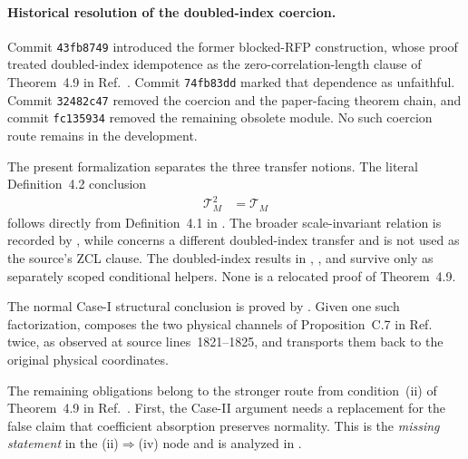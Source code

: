 \documentclass{article}
\begin{document}
\paragraph{Historical resolution of the doubled-index coercion.}
Commit \texttt{43fb8749} introduced the former blocked-RFP construction, whose
proof treated doubled-index idempotence as the zero-correlation-length clause
of Theorem~4.9 in Ref.~\cite{Cirac2016MPDO_arXiv}. Commit
\texttt{74fb83dd} marked that dependence as unfaithful. Commit
\texttt{32482c47} removed the coercion and the paper-facing theorem chain, and
commit \texttt{fc135934} removed the remaining obsolete module. No such
coercion route remains in the development.

The present formalization separates the three transfer notions. The literal
Definition~4.2 conclusion
\begin{align}
    \mathcal T_M^2
    &=\mathcal T_M
    \label{eq:zcl_definition42_literal_conclusion}
\end{align}
follows directly from Definition~4.1 in
. The broader
scale-invariant relation is recorded by , while
 concerns a different doubled-index transfer and is
not used as the source's ZCL clause. The doubled-index results in
, , and
 survive only as separately scoped conditional
helpers. None is a relocated proof of Theorem~4.9.

The normal Case-I structural conclusion is proved by
.
Given one such factorization,
composes the two physical channels of Proposition~C.7 in
Ref.~\cite{Cirac2016MPDO_arXiv} twice, as observed at source
lines~1821--1825, and transports them back to the original physical
coordinates.

The remaining obligations belong to the stronger route from condition~(ii) of
Theorem~4.9 in Ref.~\cite{Cirac2016MPDO_arXiv}. First, the Case-II argument
needs a replacement for the false claim that coefficient absorption preserves
normality. This is the \emph{missing statement} in the
(ii)$\Rightarrow$(iv) node and is analyzed in
.
\end{document}
